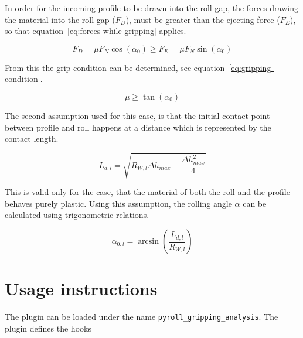 \documentclass[11pt]{PyRollDocs}
\begin{document}
    In order for the incoming profile to be drawn into the roll gap, the forces drawing the material into the roll gap ($F_D$),
    must be greater than the ejecting force ($F_E$), so that equation~\ref{eq:forces-while-gripping} applies.

    \begin{equation}
        F_D = \mu F_N \cos\left( \alpha_{0} \right) \geq F_E = \mu F_N \sin\left( \alpha_{0}  \right)
        \label{eq:forces-while-gripping}
    \end{equation}

    From this the grip condition can be determined, see equation~\ref{eq:gripping-condition}.

    \begin{equation}
        \mu \geq \tan\left( \alpha_{0} \right)
        \label{eq:gripping-condition}
    \end{equation}

    The second assumption used for this case, is that the initial contact point between profile and roll happens at a distance which is represented by the contact length.

    \begin{equation}
        L_{d, l} = \sqrt{R_{W, l} \Delta h_{max} - \frac{\Delta h_{max}^2}{4}}
        \label{eq:contact-length-gripping}
    \end{equation}

    This is valid only for the case, that the material of both the roll and the profile behaves purely plastic.
    Using this assumption, the rolling angle $\alpha$ can be calculated using trigonometric relations.

    \begin{equation}
        \alpha_{0, l} = \arcsin\left( \frac{L_{d, l}}{R_{W, l}} \right)
        \label{eq:gripping-angle}
    \end{equation}


    \section{Usage instructions}\label{sec:usage-instructions}

    The plugin can be loaded under the name \texttt{pyroll\_gripping\_analysis}.
    The plugin defines the hooks \lsto
\end{document}

